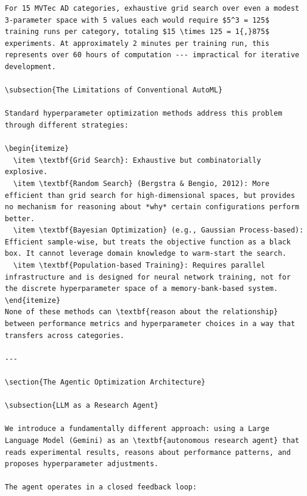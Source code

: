 \documentclass[12pt,a4paper,oneside]{report}
\begin{document}
\begin{verbatim}
For 15 MVTec AD categories, exhaustive grid search over even a modest 3-parameter space with 5 values each would require $5^3 = 125$ training runs per category, totaling $15 \times 125 = 1{,}875$ experiments. At approximately 2 minutes per training run, this represents over 60 hours of computation --- impractical for iterative development.

\subsection{The Limitations of Conventional AutoML}

Standard hyperparameter optimization methods address this problem through different strategies:

\begin{itemize}
  \item \textbf{Grid Search}: Exhaustive but combinatorially explosive.
  \item \textbf{Random Search} (Bergstra & Bengio, 2012): More efficient than grid search for high-dimensional spaces, but provides no mechanism for reasoning about *why* certain configurations perform better.
  \item \textbf{Bayesian Optimization} (e.g., Gaussian Process-based): Efficient sample-wise, but treats the objective function as a black box. It cannot leverage domain knowledge to warm-start the search.
  \item \textbf{Population-based Training}: Requires parallel infrastructure and is designed for neural network training, not for the discrete hyperparameter space of a memory-bank-based system.
\end{itemize}
None of these methods can \textbf{reason about the relationship} between performance metrics and hyperparameter choices in a way that transfers across categories.

---

\section{The Agentic Optimization Architecture}

\subsection{LLM as a Research Agent}

We introduce a fundamentally different approach: using a Large Language Model (Gemini) as an \textbf{autonomous research agent} that reads experimental results, reasons about performance patterns, and proposes hyperparameter adjustments.

The agent operates in a closed feedback loop:

\end{verbatim}
\end{document}
